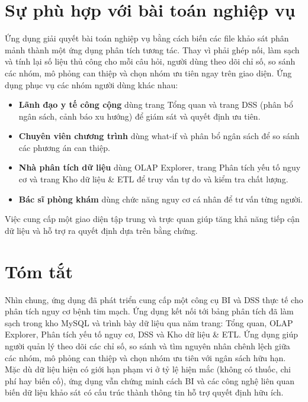 \section{Sự phù hợp với bài toán nghiệp vụ}
Ứng dụng giải quyết bài toán nghiệp vụ bằng cách biến các file khảo sát phân mảnh thành một ứng dụng phân tích tương tác. Thay vì phải ghép nối, làm sạch và tính lại số liệu thủ công cho mỗi câu hỏi, người dùng theo dõi chỉ số, so sánh các nhóm, mô phỏng can thiệp và chọn nhóm ưu tiên ngay trên giao diện. Ứng dụng phục vụ các nhóm người dùng khác nhau:
\begin{itemize}
\item \textbf{Lãnh đạo y tế công cộng} dùng trang Tổng quan và trang DSS (phân bổ ngân sách, cảnh báo xu hướng) để giám sát và quyết định ưu tiên.
\item \textbf{Chuyên viên chương trình} dùng what-if và phân bổ ngân sách để so sánh các phương án can thiệp.
\item \textbf{Nhà phân tích dữ liệu} dùng OLAP Explorer, trang Phân tích yếu tố nguy cơ và trang Kho dữ liệu \& ETL để truy vấn tự do và kiểm tra chất lượng.
\item \textbf{Bác sĩ phòng khám} dùng chức năng nguy cơ cá nhân để tư vấn từng người.
\end{itemize}
Việc cung cấp một giao diện tập trung và trực quan giúp tăng khả năng tiếp cận dữ liệu và hỗ trợ ra quyết định dựa trên bằng chứng.

\section{Tóm tắt}
Nhìn chung, ứng dụng đã phát triển cung cấp một công cụ BI và DSS thực tế cho phân tích nguy cơ bệnh tim mạch. Ứng dụng kết nối tới bảng phân tích đã làm sạch trong kho MySQL và trình bày dữ liệu qua năm trang: Tổng quan, OLAP Explorer, Phân tích yếu tố nguy cơ, DSS và Kho dữ liệu \& ETL. Ứng dụng giúp người quản lý theo dõi các chỉ số, so sánh và tìm nguyên nhân chênh lệch giữa các nhóm, mô phỏng can thiệp và chọn nhóm ưu tiên với ngân sách hữu hạn. Mặc dù dữ liệu hiện có giới hạn phạm vi ở tỷ lệ hiện mắc (không có thuốc, chi phí hay biến cố), ứng dụng vẫn chứng minh cách BI và các công nghệ liên quan biến dữ liệu khảo sát có cấu trúc thành thông tin hỗ trợ quyết định hữu ích.
